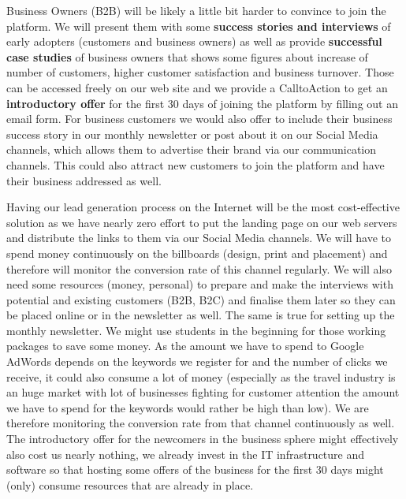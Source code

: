 \documentclass[a4paper]{article}
\begin{document}
Business Owners (B2B) will be likely a little bit harder to convince to join the platform. We will present them with some \textbf{success stories and interviews} of early adopters (customers and business owners) as well as provide \textbf{successful case studies} of business owners that shows some  figures about increase of number of customers, higher customer satisfaction and business turnover. Those can be accessed freely on our web site and we provide a Call­to­Action to get an \textbf{introductory offer} for the first 30 days of joining the platform by filling out an email form. For business customers we would also offer to include their business success story in our monthly newsletter or post about it on our Social Media channels, which allows them to advertise their brand via our communication channels. This could also attract new customers to join the platform and have their business addressed as well. \par \vspace{0.2cm}
Having our lead generation process on the Internet will be the most cost-­effective solution as we have nearly zero effort to put the landing page on our web servers and distribute the links to them via our Social Media channels. We will have to spend money continuously on the billboards (design,  print  and  placement) and therefore will monitor the conversion rate of this channel regularly. We will also need some resources (money, personal) to prepare and make the interviews with potential and existing customers (B2B, B2C) and finalise them later so they can be placed online or in the newsletter as well. The same is true for setting up the monthly newsletter. We might use students in the beginning for those working packages to save some money. As the amount we have to spend to Google AdWords depends on the keywords we register for and the number of clicks we receive, it could also consume a lot of money (especially as the travel industry is an huge market with lot of businesses fighting for customer attention the amount we have to spend for the keywords would rather be high than low). We are therefore monitoring the conversion rate from that channel continuously as well. The introductory offer for the newcomers in the business sphere might effectively also cost us nearly nothing, we already invest in the IT infrastructure and software so that hosting some offers of the business for the first 30 days might (only) consume resources that are already in place.

\end{document}
